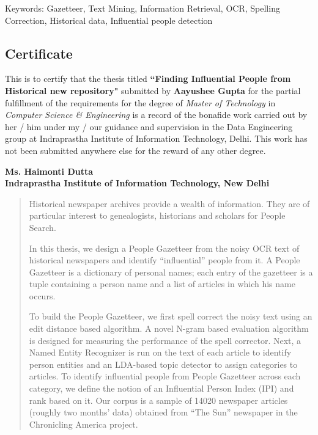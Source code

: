 \documentclass[letterpaper,11pt]{report}
\begin{document}


\newpage

\pagestyle{empty}
\vspace*{7.1in} 
Keywords: Gazetteer, Text Mining, Information Retrieval, OCR, Spelling Correction, Historical data, Influential people detection

\newpage

\begin{center}
\section*{Certificate}\label{section:certificate}
\end{center}
This is to certify that the thesis titled \textbf{``Finding Influential People from Historical new repository"} submitted by \textbf{Aayushee Gupta} for the partial fulfillment of the requirements for the degree of \emph{Master of Technology} in \emph{Computer Science \& Engineering} is a record of the bonafide work carried out by her / him under my / our guidance and supervision in the Data Engineering group at Indraprastha Institute of Information Technology, Delhi. This work has not been submitted anywhere else for the reward of any other degree. \\ \vspace{0.5in}

\textbf{Ms. Haimonti Dutta}\\
\textbf{Indraprastha Institute of Information Technology, New Delhi}

\begin{abstract}

 Historical newspaper archives provide a wealth of information. They
are of particular interest to genealogists, historians and scholars
for People Search.

 In this thesis, we design a People Gazetteer from
the noisy OCR text of historical newspapers and identify “influential”
people from it. A People Gazetteer is a dictionary of personal names;
each entry of the gazetteer is  a tuple containing a person name and a
list of articles in which his name occurs.

To build the People Gazetteer, we first spell correct the noisy text
using an edit distance based algorithm. A novel N-gram based
evaluation algorithm is designed for measuring the performance of the
spell corrector. Next, a Named Entity Recognizer is run on the text of
each article to identify person entities and an LDA-based topic
detector to assign categories to articles. To identify influential
people from People Gazetteer across each category, we define the notion
of an Influential Person Index (IPI) and rank based on it. Our corpus
is a sample of 14020 newspaper articles (roughly two months’ data)
obtained from “The Sun” newspaper in the Chronicling America project.

\end{abstract}
\end{document}
